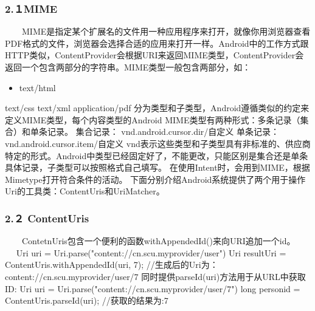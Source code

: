 \documentclass[9pt, b5paper]{article}
\begin{document}
\subsubsection{2.１MIME}
\label{sec-14-2-1}
　　MIME是指定某个扩展名的文件用一种应用程序来打开，就像你用浏览器查看PDF格式的文件，浏览器会选择合适的应用来打开一样。Android中的工作方式跟HTTP类似，ContentProvider会根据URI来返回MIME类型，ContentProvider会返回一个包含两部分的字符串。MIME类型一般包含两部分，如：
\begin{itemize}
\item text/html
\end{itemize}
text/css
text/xml
application/pdf
分为类型和子类型，Android遵循类似的约定来定义MIME类型，每个内容类型的Android MIME类型有两种形式：多条记录（集合）和单条记录。
集合记录：
vnd.android.cursor.dir/自定义
单条记录：
vnd.android.cursor.item/自定义
vnd表示这些类型和子类型具有非标准的、供应商特定的形式。Android中类型已经固定好了，不能更改，只能区别是集合还是单条具体记录，子类型可以按照格式自己填写。
在使用Intent时，会用到MIME，根据Mimetype打开符合条件的活动。
下面分别介绍Android系统提供了两个用于操作Uri的工具类：ContentUris和UriMatcher。
\subsubsection{2.２ ContentUris}
\label{sec-14-2-2}
 　　ContetnUris包含一个便利的函数withAppendedId()来向URI追加一个id。
　
Uri uri = Uri.parse("content://cn.scu.myprovider/user")
Uri resultUri = ContentUris.withAppendedId(uri, 7); 
//生成后的Uri为：content://cn.scu.myprovider/user/7
同时提供parseId(uri)方法用于从URL中获取ID:
Uri uri = Uri.parse("content://cn.scu.myprovider/user/7")
long personid = ContentUris.parseId(uri);
//获取的结果为:7
\end{document}

